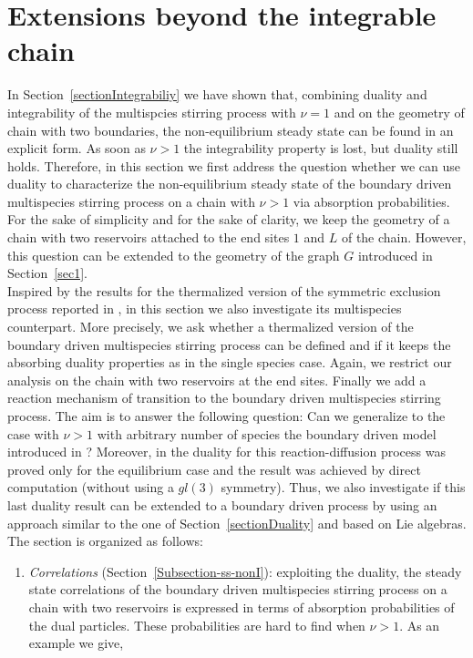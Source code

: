 \documentclass[10pt]{article}
\numberwithin{equation}{section}
\numberwithin{equation}{subsection}
\begin{document}
{\section{Extensions beyond the integrable chain}
\label{sec5}
In Section~\ref{sectionIntegrabiliy} we have shown that, combining duality and integrability of the multispcies stirring process with $\nu=1$ and on the geometry of chain with two boundaries, the non-equilibrium steady state can be found in an explicit form. As soon as $\nu>1$ the integrability property is lost, but duality still holds. Therefore, in this section we first address the  question whether we can use duality to characterize the non-equilibrium steady state of the boundary driven multispecies stirring process on a chain with $\nu>1$ via absorption probabilities. For the sake of simplicity and  for the sake of clarity, we keep the geometry of a chain with two reservoirs attached to the end sites $1$ and $L$ of the chain. However, this question can be extended to the geometry of the graph $G$ introduced in Section~\ref{sec1}.  \\
Inspired by the results for the thermalized version of the symmetric exclusion process reported in \cite{carinci2013duality}, in this section we also investigate its multispecies counterpart. More precisely, we ask whether a thermalized version of the boundary driven multispecies stirring process can be defined and if it keeps the absorbing duality properties as in the single species case. Again, we restrict our analysis on the chain with two reservoirs at the end sites. Finally we add a reaction mechanism of transition to the boundary driven multispecies stirring process. The aim is to answer the following question: Can we generalize to the case with $\nu>1$ with arbitrary number of species the boundary driven model introduced in \cite{casini2022uphill}? Moreover, in \cite{casini2022uphill} the duality for this reaction-diffusion process was proved only for the equilibrium case and the result was achieved by direct computation (without using a $gl(3)$ symmetry). Thus, we also investigate if this last duality result can be extended to a boundary driven process by using an approach similar to the one of Section~\ref{sectionDuality} and based on Lie algebras. The section is organized as follows: 
\begin{enumerate}
	\item \textit{Correlations} (Section~\ref{Subsection-ss-nonI}): exploiting the duality, the steady state correlations {\color{black} of the boundary driven multispecies stirring process on a chain with two reservoirs} is expressed in terms of absorption probabilities of the dual particles. These probabilities are hard to find when $\nu>1$. As an example we give, 

\end{enumerate}}
\end{document}
